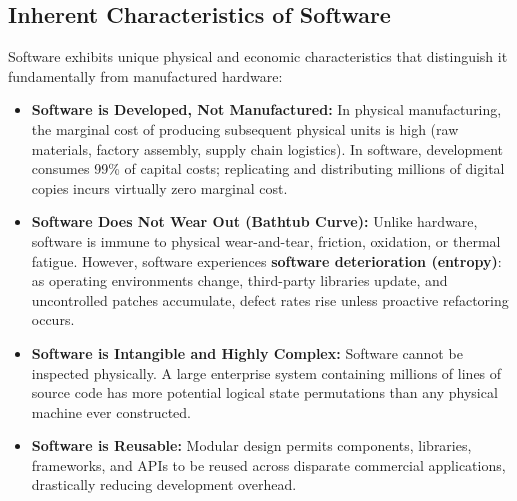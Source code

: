 \subsection{Inherent Characteristics of Software}
Software exhibits unique physical and economic characteristics that distinguish it fundamentally from manufactured hardware:
\begin{itemize}
    \item \textbf{Software is Developed, Not Manufactured:} In physical manufacturing, the marginal cost of producing subsequent physical units is high (raw materials, factory assembly, supply chain logistics). In software, development consumes 99\% of capital costs; replicating and distributing millions of digital copies incurs virtually zero marginal cost.
    \item \textbf{Software Does Not Wear Out (Bathtub Curve):} Unlike hardware, software is immune to physical wear-and-tear, friction, oxidation, or thermal fatigue. However, software experiences \textbf{software deterioration (entropy)}: as operating environments change, third-party libraries update, and uncontrolled patches accumulate, defect rates rise unless proactive refactoring occurs.
    \item \textbf{Software is Intangible and Highly Complex:} Software cannot be inspected physically. A large enterprise system containing millions of lines of source code has more potential logical state permutations than any physical machine ever constructed.
    \item \textbf{Software is Reusable:} Modular design permits components, libraries, frameworks, and APIs to be reused across disparate commercial applications, drastically reducing development overhead.
\end{itemize}

